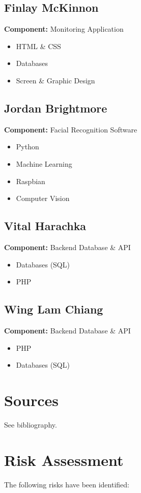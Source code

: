 \documentclass[11pt]{report}
\begin{document}
\subsection{Finlay McKinnon}
\textbf{Component:} Monitoring Application
\begin{itemize}
	\item HTML \& CSS
	\item Databases
	\item Screen \& Graphic Design 
\end{itemize}

\subsection{Jordan Brightmore}
\textbf{Component:} Facial Recognition Software
\begin{itemize}
	\item Python
	\item Machine Learning
	\item Raspbian
	\item Computer Vision
\end{itemize}

\subsection{Vital Harachka}
\textbf{Component:} Backend Database \& API
\begin{itemize}
	\item Databases (SQL)
	\item PHP
\end{itemize}


\subsection{Wing Lam Chiang}
\textbf{Component:} Backend Database \& API
\begin{itemize}
	\item PHP
	\item Databases (SQL)
\end{itemize}


\section{Sources}
See bibliography.

\section{Risk Assessment}
The following risks have been identified:
\end{document}
